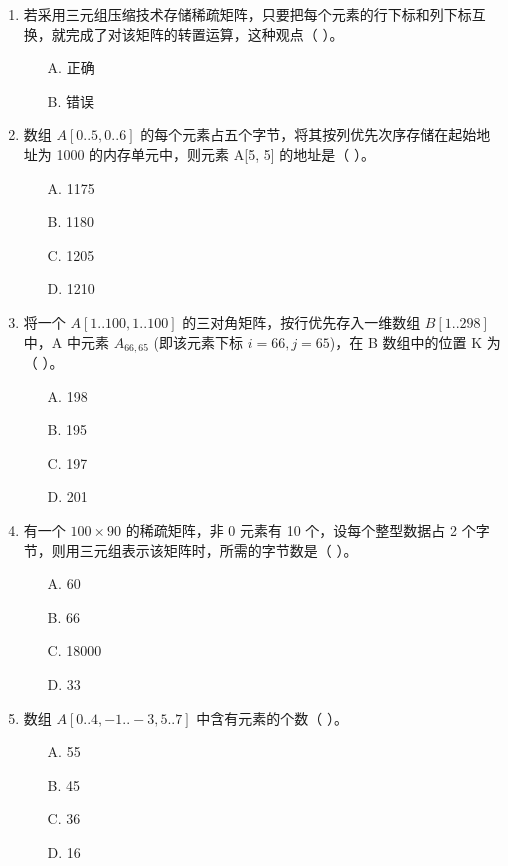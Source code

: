 \documentclass[12pt, a4paper]{article}
\begin{document}
\begin{enumerate}
    \item 若采用三元组压缩技术存储稀疏矩阵，只要把每个元素的行下标和列下标互换，就完成了对该矩阵的转置运算，这种观点（ ）。
    \begin{enumerate}
        \item[A.] 正确
        \item[B.] 错误
    \end{enumerate}
    
    \item 数组 $A[0..5, 0..6]$ 的每个元素占五个字节，将其按列优先次序存储在起始地址为 1000 的内存单元中，则元素 A[5, 5] 的地址是（ ）。
    \begin{enumerate}
        \item[A.] 1175
        \item[B.] 1180
        \item[C.] 1205
        \item[D.] 1210
    \end{enumerate}
    
    \item 将一个 $A[1..100, 1..100]$ 的三对角矩阵，按行优先存入一维数组 $B[1..298]$ 中，A 中元素 $A_{66,65}$ (即该元素下标 $i=66, j=65$)，在 B 数组中的位置 K 为（ ）。
    \begin{enumerate}
        \item[A.] 198
        \item[B.] 195
        \item[C.] 197
        \item[D.] 201
    \end{enumerate}
    
    \item 有一个 $100 \times 90$ 的稀疏矩阵，非 0 元素有 10 个，设每个整型数据占 2 个字节，则用三元组表示该矩阵时，所需的字节数是（ ）。
    \begin{enumerate}
        \item[A.] 60
        \item[B.] 66
        \item[C.] 18000
        \item[D.] 33
    \end{enumerate}
    
    \item 数组 $A[0..4, -1..-3, 5..7]$ 中含有元素的个数（ ）。
    \begin{enumerate}
        \item[A.] 55
        \item[B.] 45
        \item[C.] 36
        \item[D.] 16
    \end{enumerate}
    

\end{enumerate}
\end{document}
